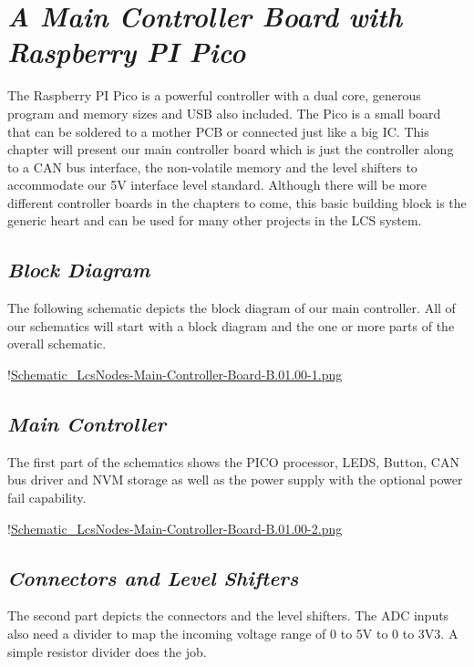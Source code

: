 \chapter{\textit{A Main Controller Board with Raspberry PI Pico}}

The Raspberry PI Pico is a powerful controller with a dual core, generous program and memory sizes and USB also included. The Pico is a small board that can be soldered to a mother PCB or connected just like a big IC. This chapter will present our main controller board which is just the controller along to a CAN bus interface, the non-volatile memory and the level shifters to accommodate our 5V interface level standard. Although there will be more different controller boards in the chapters to come, this basic building block is the generic heart and can be used for many other projects in the LCS system.

\section{\textit{Block Diagram}}

The following schematic depicts the block diagram of our main controller. All of our schematics will start with a block diagram and the one or more parts of the overall schematic.

!\href{./Schematics/Schematic_LcsNodes-Main-Controller-Board-B.01.00-1.png }{Schematic_LcsNodes-Main-Controller-Board-B.01.00-1.png}

\section{\textit{Main Controller}}

The first part of the schematics shows the PICO processor, LEDS, Button, CAN bus driver and NVM storage as well as the power supply with the optional power fail capability.

!\href{./Schematics/Schematic_LcsNodes-Main-Controller-Board-B.01.00-2.png }{Schematic_LcsNodes-Main-Controller-Board-B.01.00-2.png}

\section{\textit{Connectors and Level Shifters}}

The second part depicts the connectors and the level shifters. The ADC inputs also need a divider to map the incoming voltage range of 0 to 5V to 0 to 3V3. A simple resistor divider does the job.

